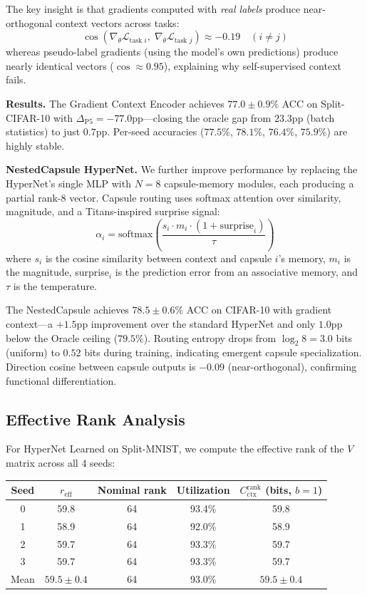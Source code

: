 \documentclass{article}
\begin{document}
The key insight is that gradients computed with \emph{real labels} produce near-orthogonal context vectors across tasks:
\begin{equation}
    \cos(\nabla_\theta \mathcal{L}_{\text{task } i},\; \nabla_\theta \mathcal{L}_{\text{task } j}) \approx -0.19 \quad (i \neq j)
\end{equation}
whereas pseudo-label gradients (using the model's own predictions) produce nearly identical vectors ($\cos \approx 0.95$), explaining why self-supervised context fails.

\textbf{Results.} The Gradient Context Encoder achieves $77.0 \pm 0.9\%$ ACC on Split-CIFAR-10 with $\Delta_\mathrm{P5} = -77.0$pp---closing the oracle gap from $23.3$pp (batch statistics) to just $0.7$pp. Per-seed accuracies ($77.5\%$, $78.1\%$, $76.4\%$, $75.9\%$) are highly stable.

\textbf{NestedCapsule HyperNet.} We further improve performance by replacing the HyperNet's single MLP with $N = 8$ capsule-memory modules, each producing a partial rank-8 vector. Capsule routing uses softmax attention over similarity, magnitude, and a Titans-inspired surprise signal:
\begin{equation}
    \alpha_i = \mathrm{softmax}\!\left(\frac{s_i \cdot m_i \cdot (1 + \text{surprise}_i)}{\tau}\right)
\end{equation}
where $s_i$ is the cosine similarity between context and capsule $i$'s memory, $m_i$ is the magnitude, surprise$_i$ is the prediction error from an associative memory, and $\tau$ is the temperature.

The NestedCapsule achieves $78.5 \pm 0.6\%$ ACC on CIFAR-10 with gradient context---a $+1.5$pp improvement over the standard HyperNet and only $1.0$pp below the Oracle ceiling ($79.5\%$). Routing entropy drops from $\log_2 8 = 3.0$ bits (uniform) to $0.52$ bits during training, indicating emergent capsule specialization. Direction cosine between capsule outputs is $-0.09$ (near-orthogonal), confirming functional differentiation.

\subsection{Effective Rank Analysis}
\label{sec:rank_analysis}

For HyperNet Learned on Split-MNIST, we compute the effective rank of the $V$ matrix across all 4 seeds:

\begin{table}[h]
\centering
\small
\begin{tabular}{ccccc}
\toprule
Seed & $r_\mathrm{eff}$ & Nominal rank & Utilization & $C_\mathrm{ctx}^\mathrm{rank}$ (bits, $b=1$) \\
\midrule
0 & 59.8 & 64 & 93.4\% & 59.8 \\
1 & 58.9 & 64 & 92.0\% & 58.9 \\
2 & 59.7 & 64 & 93.3\% & 59.7 \\
3 & 59.7 & 64 & 93.3\% & 59.7 \\
\midrule
Mean & $59.5 \pm 0.4$ & 64 & 93.0\% & $59.5 \pm 0.4$ \\
\bottomrule
\end{tabular}
\end{table}
\end{document}
